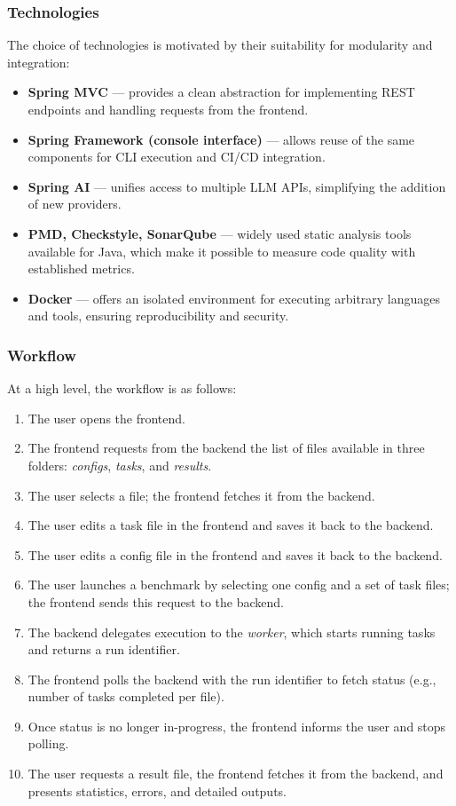 \subsubsection{Technologies}

The choice of technologies is motivated by their suitability for modularity and integration:
\begin{itemize}
    \item \textbf{Spring MVC} --- provides a clean abstraction for implementing REST endpoints and handling requests from the frontend.
    \item \textbf{Spring Framework (console interface)} --- allows reuse of the same components for CLI execution and CI/CD integration.
    \item \textbf{Spring AI} --- unifies access to multiple LLM APIs, simplifying the addition of new providers.
    \item \textbf{PMD, Checkstyle, SonarQube} --- widely used static analysis tools available for Java, which make it possible to measure code quality with established metrics.
    \item \textbf{Docker} --- offers an isolated environment for executing arbitrary languages and tools, ensuring reproducibility and security.
\end{itemize}

\subsubsection{Workflow}

At a high level, the workflow is as follows:
\begin{enumerate}
    \item The user opens the frontend.
    \item The frontend requests from the backend the list of files available in three folders: \textit{configs}, \textit{tasks}, and \textit{results}.
    \item The user selects a file; the frontend fetches it from the backend.
    \item The user edits a task file in the frontend and saves it back to the backend.
    \item The user edits a config file in the frontend and saves it back to the backend.
    \item The user launches a benchmark by selecting one config and a set of task files; the frontend sends this request to the backend.
    \item The backend delegates execution to the \textit{worker}, which starts running tasks and returns a run identifier.
    \item The frontend polls the backend with the run identifier to fetch status (e.g., number of tasks completed per file).
    \item Once status is no longer in-progress, the frontend informs the user and stops polling.
    \item The user requests a result file, the frontend fetches it from the backend, and presents statistics, errors, and detailed outputs.
\end{enumerate}

